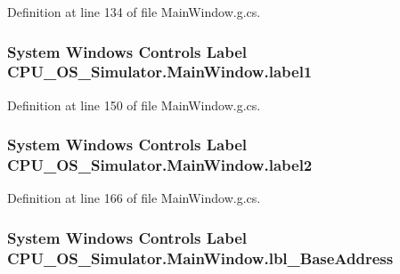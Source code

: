 Definition at line 134 of file Main\+Window.\+g.\+cs.

\hypertarget{class_c_p_u___o_s___simulator_1_1_main_window_a09b3ba374a620331bc447b32959260c2}{}
\subsubsection[{label1}]{\setlength{\rightskip}{0pt plus 5cm}System Windows Controls Label C\+P\+U\+\_\+\+O\+S\+\_\+\+Simulator.\+Main\+Window.\+label1\hspace{0.3cm}{\ttfamily [package]}}\label{class_c_p_u___o_s___simulator_1_1_main_window_a09b3ba374a620331bc447b32959260c2}


Definition at line 150 of file Main\+Window.\+g.\+cs.

\hypertarget{class_c_p_u___o_s___simulator_1_1_main_window_a88c7b6748a5e198c673a3c3c5178d3b8}{}
\subsubsection[{label2}]{\setlength{\rightskip}{0pt plus 5cm}System Windows Controls Label C\+P\+U\+\_\+\+O\+S\+\_\+\+Simulator.\+Main\+Window.\+label2\hspace{0.3cm}{\ttfamily [package]}}\label{class_c_p_u___o_s___simulator_1_1_main_window_a88c7b6748a5e198c673a3c3c5178d3b8}


Definition at line 166 of file Main\+Window.\+g.\+cs.

\hypertarget{class_c_p_u___o_s___simulator_1_1_main_window_ae3adff2ef98d792ce094dcc229c293a8}{}
\subsubsection[{lbl\+\_\+\+Base\+Address}]{\setlength{\rightskip}{0pt plus 5cm}System Windows Controls Label C\+P\+U\+\_\+\+O\+S\+\_\+\+Simulator.\+Main\+Window.\+lbl\+\_\+\+Base\+Address\hspace{0.3cm}{\ttfamily [package]}}\label{class_c_p_u___o_s___simulator_1_1_main_window_ae3adff2ef98d792ce094dcc229c293a8}


